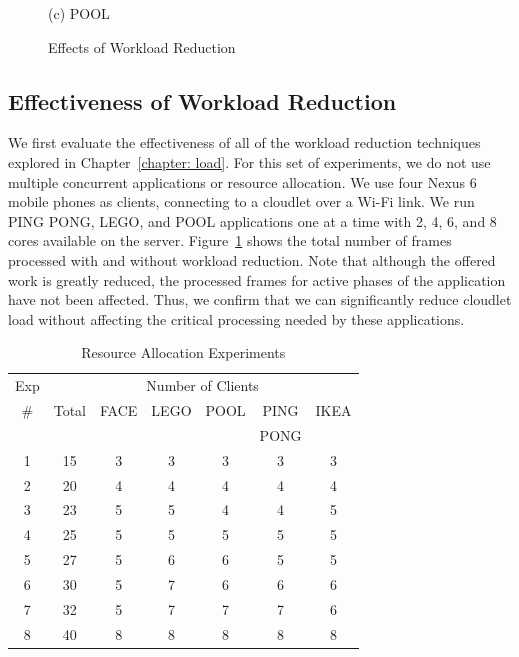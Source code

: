 \begin{figure}
\begin{minipage}[b]{0.3\linewidth}
{(c) POOL}
\end{minipage}
\caption{\small Effects of Workload Reduction}
\label{figs:workload-reduction}
\end{figure}


\subsection{Effectiveness of Workload Reduction}

We first evaluate the effectiveness of all of the workload reduction techniques
explored in Chapter~\ref{chapter: load}. For this set of experiments, we do not
use multiple concurrent applications or resource allocation. We use four Nexus 6
mobile phones as clients, connecting to a cloudlet over a Wi-Fi link. We run
PING PONG, LEGO, and POOL applications one at a time with 2, 4, 6, and 8 cores
available on the server. Figure~\ref{figs:workload-reduction} shows the total
number of frames processed with and without workload reduction. Note that
although the offered work is greatly reduced, the processed frames for active
phases of the application have not been affected. Thus, we confirm that we can
significantly reduce cloudlet load without affecting the critical processing
needed by these applications.

\begin{table}[]
\centering
\begin{tabular}{|c|c||c|c|c|c|c|}
  \hline
  Exp & \multicolumn{6}{|c|}{Number of Clients} \\
  \cline{2-7}
  \#  & Total & FACE & LEGO & POOL & PING & IKEA \\
      &      &   &   &  & PONG &  \\ \hline
  1   & 15  & 3 & 3 & 3 & 3 & 3 \\ \hline
  2   & 20  & 4 & 4 & 4 & 4 & 4 \\ \hline
  3   & 23  & 5 & 5 & 4 & 4 & 5\\ \hline
  4   & 25  & 5 & 5 & 5 & 5 & 5 \\ \hline
  5   & 27  & 5 & 6 & 6 & 5 & 5 \\ \hline
  6  & 30  & 5 & 7 & 6 & 6 & 6 \\ \hline
  7  & 32  & 5 & 7 & 7 & 7 & 6 \\ \hline
  8  & 40  & 8 & 8 & 8 & 8 & 8 \\ \hline
\end{tabular}
\vspace{0.1in}
\caption{Resource Allocation Experiments} 
\label{tab:alloc-exps}
\end{table}


